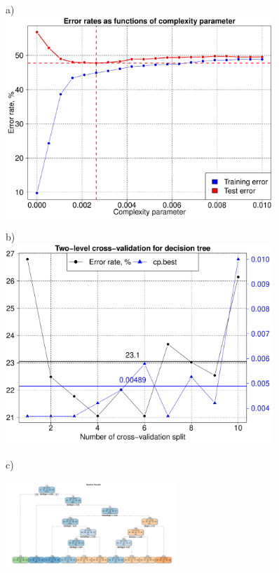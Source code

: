 \documentclass[10pt, paper=a4]{article}
\begin{document}
\begin{figure}[h!]
  \centering
  \begin{minipage}{0.49\textwidth}
    a)\\
    \includegraphics[width = 0.9\textwidth]{decision_tree_err_CV1.pdf}
  \end{minipage} \hfill
  \begin{minipage}{0.49\textwidth}
    b)\\
    \includegraphics[width = 0.9\textwidth]{decision_tree_CV2.pdf}
  \end{minipage} \vfill
  \begin{minipage}{0.99\textwidth}
    c)\\
    \begin{center}
      \includegraphics[width = 0.58\textwidth]{decision_tree.pdf}

\end{center}
\end{minipage}
\end{figure}
\end{document}
